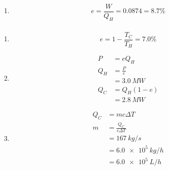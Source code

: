 \documentclass{article}
\begin{document}
\begin{enumerate}
  \item \[e = \frac{W}{Q_H} = 0.0874 = 8.7\%\]
\end{enumerate}

\setcounter{subsubsection}{40}
\subsubsection{}

\begin{enumerate}
  \item \[e = 1 - \frac{T_C}{T_H} = 7.0\%\]

  \item

        \begin{align*}
          P   & = e Q_H         \\
          Q_H & = \frac{P}{e}   \\
              & = \qty{3.0}{MW} \\
          Q_C & = Q_H (1 - e)   \\
              & = \qty{2.8}{MW}
        \end{align*}

  \item

        \begin{align*}
          Q_C & = m c \Delta T           \\
          m   & = \frac{Q_C}{c \Delta T} \\
              & = \qty{167}{kg/s}        \\
              & = \qty{6.0e5}{kg/h}      \\
              & = \qty{6.0e5}{L/h}
        \end{align*}
\end{enumerate}

\setcounter{subsubsection}{44}
\subsubsection{}
\end{document}
